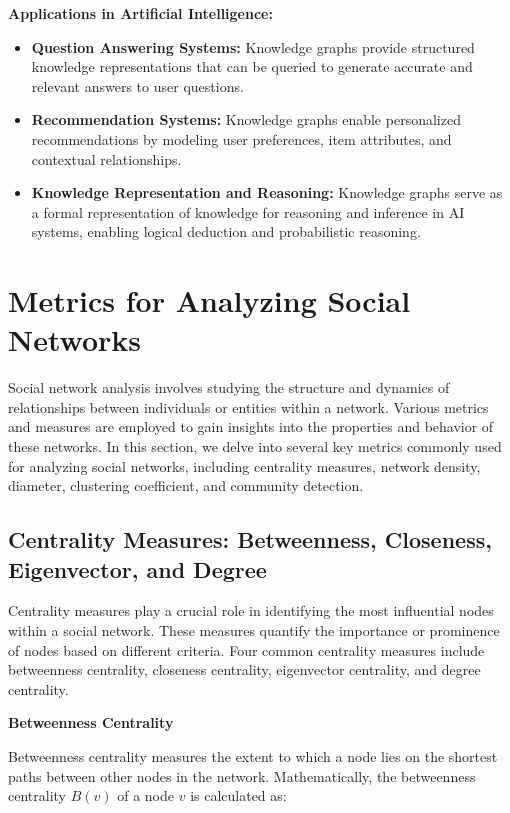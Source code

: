 \documentclass[12pt]{book} %
\begin{document}
\textbf{Applications in Artificial Intelligence:}
\begin{itemize}
    \item \textbf{Question Answering Systems:} Knowledge graphs provide structured knowledge representations that can be queried to generate accurate and relevant answers to user questions.
    \item \textbf{Recommendation Systems:} Knowledge graphs enable personalized recommendations by modeling user preferences, item attributes, and contextual relationships.
    \item \textbf{Knowledge Representation and Reasoning:} Knowledge graphs serve as a formal representation of knowledge for reasoning and inference in AI systems, enabling logical deduction and probabilistic reasoning.
\end{itemize}

\section{Metrics for Analyzing Social Networks}

Social network analysis involves studying the structure and dynamics of relationships between individuals or entities within a network. Various metrics and measures are employed to gain insights into the properties and behavior of these networks. In this section, we delve into several key metrics commonly used for analyzing social networks, including centrality measures, network density, diameter, clustering coefficient, and community detection.

\subsection{Centrality Measures: Betweenness, Closeness, Eigenvector, and Degree}

Centrality measures play a crucial role in identifying the most influential nodes within a social network. These measures quantify the importance or prominence of nodes based on different criteria. Four common centrality measures include betweenness centrality, closeness centrality, eigenvector centrality, and degree centrality.

\textbf{Betweenness Centrality}

Betweenness centrality measures the extent to which a node lies on the shortest paths between other nodes in the network. Mathematically, the betweenness centrality \(B(v)\) of a node \(v\) is calculated as:
\end{document}
